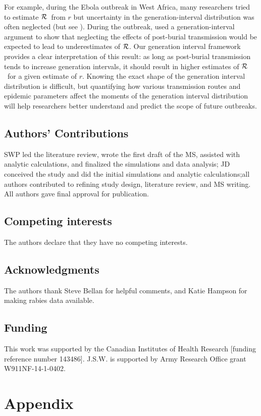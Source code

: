 \documentclass[12pt]{article}
\newcommand{\RR}{\ensuremath{{\cal R}}}
\begin{document}
For example, during the Ebola outbreak in West Africa, many researchers tried to estimate \RR\ from $r$ \cite{Alth14, AylwBarb14, NishChow15, RiveLofgren14, 
KingDome15} but uncertainty in the generation-interval distribution was often neglected (but see \cite{TaylDush16}).  
During the outbreak, \cite{WeitDush15} used a generation-interval argument to show that neglecting the effects of post-burial transmission would be expected to lead to underestimates of \RR.
Our generation interval framework provides a clear interpretation of this result: as long as post-burial transmission tends to increase generation intervals, it should result in higher estimates of \RR\ for a given estimate of $r$.
Knowing the exact shape of the generation interval distribution is difficult, but quantifying how various transmission routes and epidemic parameters affect the moments of the generation interval distribution will help researchers better understand and predict the scope of future outbreaks.

\subsection*{Authors' Contributions}

SWP led the literature review, wrote the first draft of the MS, assisted with analytic calculations, and finalized the simulations and data analysis; JD conceived the study and did the initial simulations and analytic calculations;all authors contributed to refining study design, literature review, and MS writing. All authors gave final approval for publication.

\subsection*{Competing interests}

The authors declare that they have no competing interests.

\subsection*{Acknowledgments}

The authors thank Steve Bellan for helpful comments, and Katie Hampson for making rabies data available.

\subsection*{Funding}

This work was supported by the Canadian Institutes of Health Research [funding reference number 143486]. J.S.W. is supported by Army Research Office grant W911NF-14-1-0402.

\printbibliography

\clearpage

\section{Appendix}


\end{document}
